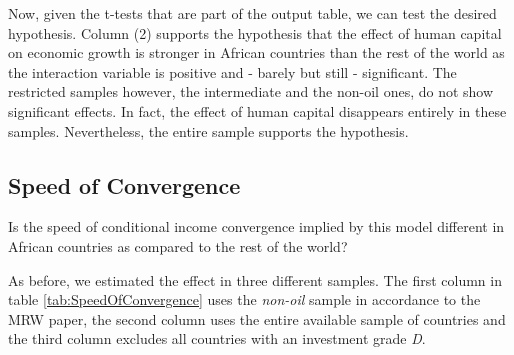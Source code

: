 \documentclass[a4paper,11pt]{article}
\begin{document}
Now, given the t-tests that are part of the output table, we can test the desired hypothesis. Column (2) supports the hypothesis that the effect of human capital on economic growth is stronger in African countries than the rest of the world as the interaction variable is positive and - barely but still - significant.
The restricted samples however, the intermediate and the non-oil ones, do not show significant effects. In fact, the effect of human capital disappears entirely in these samples. Nevertheless, the entire sample supports the hypothesis.

\pagebreak

\begin{qbox}{\subsection{Speed of Convergence}}
Is the speed of conditional income convergence implied by this model different in African countries as compared to the rest of the world?
\end{qbox}

As before, we estimated the effect in three different samples. The first column in table \ref{tab:SpeedOfConvergence} uses the \textit{non-oil} sample in accordance to the MRW paper, the second column uses the entire available sample of countries and the third column excludes all countries with an investment grade \textit{D}.
\end{document}
